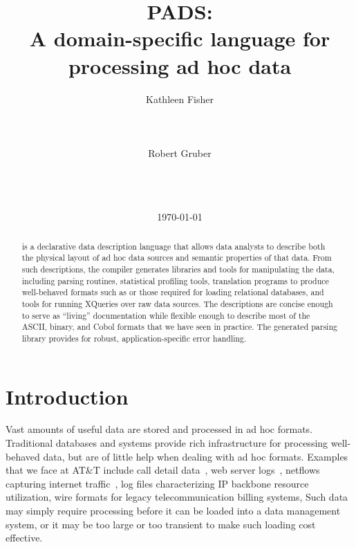 \documentclass{sig-alternate}
\begin{document}
\title{PADS:\\ A domain-specific language for processing ad hoc data}

\author{
\alignauthor Kathleen Fisher\\
       \\
       \\
       \\
\alignauthor Robert Gruber\\
       \\
       \\
       \\
}

\date{\today}
\maketitle
\begin{abstract}
\pads{} is a declarative data description language that allows data
analysts to describe both the physical layout of ad hoc data sources
and semantic properties of that data.  From such descriptions, the
\pads{} compiler generates libraries and tools for manipulating the
data, including parsing routines, statistical profiling tools,
translation programs to produce well-behaved
formats such as \xml{} or those required for loading relational
databases, and tools for running XQueries over raw \pads{} data sources.
The descriptions are concise enough to serve as ``living'' documentation
while flexible enough to describe most of the ASCII, binary, and
Cobol formats that we have seen in practice.  The generated parsing
library provides for robust, application-specific error handling.
\end{abstract}

\section{Introduction}
Vast amounts of useful data are stored and processed in ad hoc formats.
Traditional databases and \xml{} systems provide rich infrastructure
for processing well-behaved data, but are of little help when dealing with ad hoc formats.
Examples that we face at AT\&T include call detail data~\cite{hancock-toplas}, 
web server logs~\cite{wpp}, 
netflows capturing internet traffic~\cite{netflow}, 
log files characterizing IP backbone resource utilization,
wire formats for legacy telecommunication billing systems, 
\etc{}
Such data may simply require processing before it can be loaded into a
data management system, or it may be too large or too transient to
make such loading cost effective.
\end{document}

